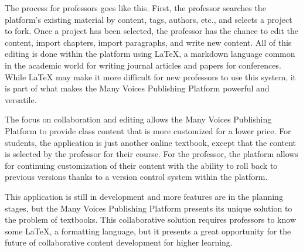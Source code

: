 \documentclass[letterpaper,10pt]{article}
\begin{document}
\normalsize{
The process for professors goes like this. First, the professor searches the platform’s existing material by content, tags, authors, etc., and selects a project to fork. Once a project has been selected, the professor has the chance to edit the content, import chapters, import paragraphs, and write new content. All of this editing is done within the platform using LaTeX, a markdown language common in the academic world for writing journal articles and papers for conferences. While LaTeX may make it more difficult for new professors to use this system, it is part of what makes the Many Voices Publishing Platform powerful and versatile.

The focus on collaboration and editing allows the Many Voices Publishing Platform to provide class 
content that is more customized for a lower price. For students, the application is just another 
online textbook, except that the content is selected by the professor for their course. For the 
professor, the platform allows for continuing customization of their content with the ability to 
roll back to previous versions thanks to a version control system within the platform.

This application is still in development and more features are in the planning stages, but the Many 
Voices Publishing Platform presents its unique solution to the problem of textbooks. This 
collaborative solution requires professors to know some LaTeX, a formatting language, but it presents 
a great opportunity for the future of collaborative content development for higher learning.
}
\end{document}
